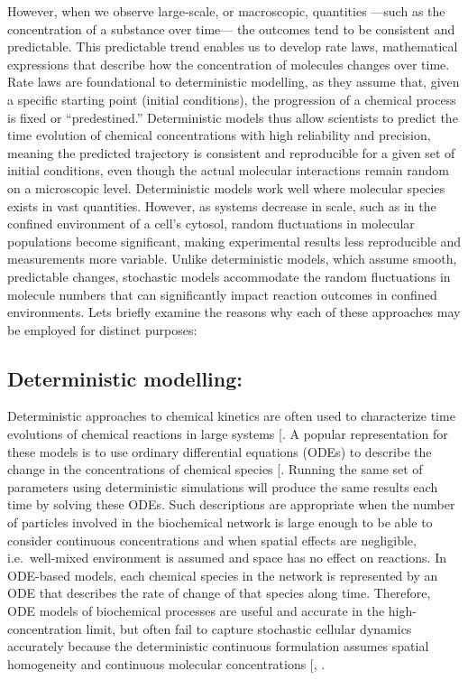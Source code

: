 \documentclass[
  11pt,
  letterpaper,
]{scrreprt}
\begin{document}
However, when we observe large-scale, or macroscopic, quantities ---such
as the concentration of a substance over time--- the outcomes tend to be
consistent and predictable. This predictable trend enables us to develop
rate laws, mathematical expressions that describe how the concentration
of molecules changes over time. Rate laws are foundational to
deterministic modelling, as they assume that, given a specific starting
point (initial conditions), the progression of a chemical process is
fixed or ``predestined.'' Deterministic models thus allow scientists to
predict the time evolution of chemical concentrations with high
reliability and precision, meaning the predicted trajectory is
consistent and reproducible for a given set of initial conditions, even
though the actual molecular interactions remain random on a microscopic
level. Deterministic models work well where molecular species exists in
vast quantities. However, as systems decrease in scale, such as in the
confined environment of a cell's cytosol, random fluctuations in
molecular populations become significant, making experimental results
less reproducible and measurements more variable. Unlike deterministic
models, which assume smooth, predictable changes, stochastic models
accommodate the random fluctuations in molecule numbers that can
significantly impact reaction outcomes in confined environments. Lets
briefly examine the reasons why each of these approaches may be employed
for distinct purposes:

\subsection*{Deterministic modelling:}\label{deterministic-modelling}

Deterministic approaches to chemical kinetics are often used to
characterize time evolutions of chemical reactions in large systems
{[}\citeproc{ref-marin2019Kinetics}{273}{]}. A popular representation
for these models is to use ordinary differential equations (ODEs) to
describe the change in the concentrations of chemical species
{[}\citeproc{ref-hoops2016Chapter}{274}{]}. Running the same set of
parameters using deterministic simulations will produce the same results
each time by solving these ODEs. Such descriptions are appropriate when
the number of particles involved in the biochemical network is large
enough to be able to consider continuous concentrations and when spatial
effects are negligible, i.e.~well-mixed environment is assumed and space
has no effect on reactions. In ODE-based models, each chemical species
in the network is represented by an ODE that describes the rate of
change of that species along time. Therefore, ODE models of biochemical
processes are useful and accurate in the high-concentration limit, but
often fail to capture stochastic cellular dynamics accurately because
the deterministic continuous formulation assumes spatial homogeneity and
continuous molecular concentrations
{[},
\citeproc{ref-smith2019Spatial}{276}{]}.
\end{document}
